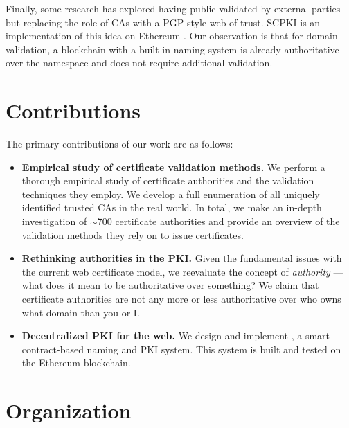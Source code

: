 Finally, some research has explored having public validated by external parties but replacing the role of CAs with a PGP-style web of trust. SCPKI is an implementation of this idea on Ethereum \cite{al2017scpki}. Our observation is that for domain validation, a blockchain with a built-in naming system is already authoritative over the namespace and does not require additional validation. 

\section{Contributions}

The primary contributions of our work are as follows:

\begin{itemize}
\item \textbf{Empirical study of certificate validation methods.} We perform a thorough empirical study of certificate authorities and the validation techniques they employ. We develop a full enumeration of all uniquely identified trusted CAs in the real world.  In total, we make an in-depth investigation of ${\sim}$700 certificate authorities and provide an overview of the validation methods they rely on to issue certificates.   

\item \textbf{Rethinking authorities in the PKI.} Given the fundamental issues with the current web certificate model, we reevaluate the concept of \emph{authority} --- what does it mean to be authoritative over something? We claim that certificate authorities are not any more or less authoritative over who owns what domain than you or I.

\item \textbf{Decentralized PKI for the web.} We design and implement  \Ghazalstar, a smart contract-based naming and PKI \UA system. This system is built and tested on the Ethereum blockchain. 

\end{itemize}


\section{Organization}

